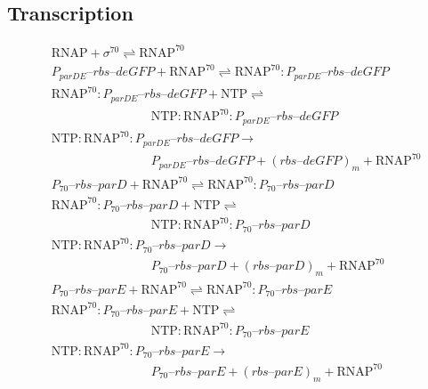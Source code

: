 \documentclass[english]{report}
\begin{document}
	\subsection{Transcription}

\begin{align}
& \mathrm{RNAP} + \sigma^{70} \rightleftharpoons \mathrm{RNAP^{70}} \\
& P_{parDE}\textrm{--}rbs\textrm{--}deGFP + \mathrm{RNAP^{70}} \rightleftharpoons \mathrm{RNAP^{70}}\!:\!P_{parDE}\textrm{--}rbs\textrm{--}deGFP \\
& \mathrm{RNAP^{70}}\!:\!P_{parDE}\textrm{--}rbs\textrm{--}deGFP + \mathrm{NTP} \rightleftharpoons \nonumber \\ 
& \qquad \qquad \qquad \qquad \mathrm{NTP}\!:\!\mathrm{RNAP^{70}}\!:\!P_{parDE}\textrm{--}rbs\textrm{--}deGFP \\
& \mathrm{NTP}\!:\!\mathrm{RNAP^{70}}\!:\!P_{parDE}\textrm{--}rbs\textrm{--}deGFP \rightarrow \nonumber \\ 
& \qquad \qquad \qquad \qquad P_{parDE}\textrm{--}rbs\textrm{--}deGFP +  (rbs\textrm{--}deGFP)_m + \mathrm{RNAP^{70}} \\
& P_{70}\textrm{--}rbs\textrm{--}parD + \mathrm{RNAP^{70}} \rightleftharpoons \mathrm{RNAP^{70}}\!:\!P_{70}\textrm{--}rbs\textrm{--}parD \\
& \mathrm{RNAP^{70}}\!:\!P_{70}\textrm{--}rbs\textrm{--}parD + \mathrm{NTP} \rightleftharpoons \nonumber \\ 
& \qquad \qquad \qquad \qquad \mathrm{NTP}\!:\!\mathrm{RNAP^{70}}\!:\!P_{70}\textrm{--}rbs\textrm{--}parD \\
& \mathrm{NTP}\!:\!\mathrm{RNAP^{70}}\!:\!P_{70}\textrm{--}rbs\textrm{--}parD \rightarrow \nonumber \\ 
& \qquad \qquad \qquad \qquad P_{70}\textrm{--}rbs\textrm{--}parD +  (rbs\textrm{--}parD)_m + \mathrm{RNAP^{70}} \\
& P_{70}\textrm{--}rbs\textrm{--}parE + \mathrm{RNAP^{70}} \rightleftharpoons \mathrm{RNAP^{70}}\!:\!P_{70}\textrm{--}rbs\textrm{--}parE \\
& \mathrm{RNAP^{70}}\!:\!P_{70}\textrm{--}rbs\textrm{--}parE + \mathrm{NTP} \rightleftharpoons \nonumber \\ 
& \qquad \qquad \qquad \qquad \mathrm{NTP}\!:\!\mathrm{RNAP^{70}}\!:\!P_{70}\textrm{--}rbs\textrm{--}parE \\
& \mathrm{NTP}\!:\!\mathrm{RNAP^{70}}\!:\!P_{70}\textrm{--}rbs\textrm{--}parE \rightarrow \nonumber \\ 
& \qquad \qquad \qquad \qquad P_{70}\textrm{--}rbs\textrm{--}parE +  (rbs\textrm{--}parE)_m + \mathrm{RNAP^{70}}
\end{align}
\end{document}

